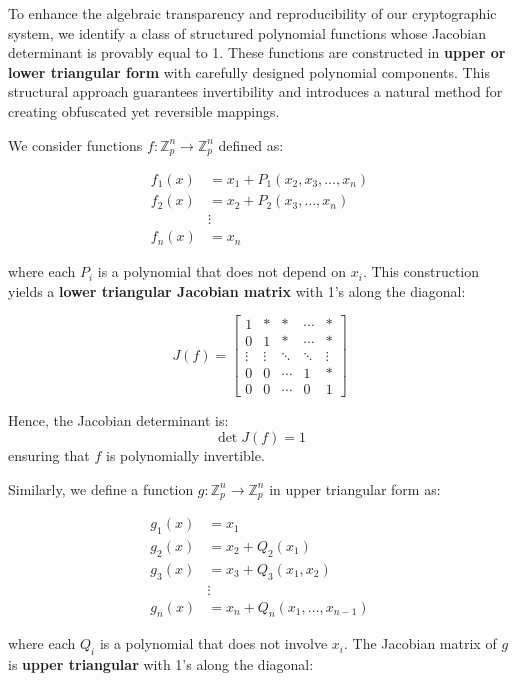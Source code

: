 \documentclass[12pt]{article}
\begin{document}
To enhance the algebraic transparency and reproducibility of our cryptographic system, we identify a class of structured polynomial functions whose Jacobian determinant is provably equal to 1. These functions are constructed in \textbf{upper or lower triangular form} with carefully designed polynomial components. This structural approach guarantees invertibility and introduces a natural method for creating obfuscated yet reversible mappings.

We consider functions \( f: \mathbb{Z}_p^n \rightarrow \mathbb{Z}_p^n \) defined as:

\begin{align*}
f_1(x) &= x_1 + P_1(x_2, x_3, \dots, x_n) \\
f_2(x) &= x_2 + P_2(x_3, \dots, x_n) \\
&\vdots \\
f_n(x) &= x_n
\end{align*}

where each \( P_i \) is a polynomial that does not depend on \( x_i \). This construction yields a \textbf{lower triangular Jacobian matrix} with 1’s along the diagonal:

\[
J(f) =
\begin{bmatrix}
1 & * & * & \cdots & * \\
0 & 1 & * & \cdots & * \\
\vdots & \vdots & \ddots & \ddots & \vdots \\
0 & 0 & \cdots & 1 & * \\
0 & 0 & \cdots & 0 & 1
\end{bmatrix}
\]

Hence, the Jacobian determinant is:
\[
\det J(f) = 1
\]
ensuring that \( f \) is polynomially invertible.

Similarly, we define a function \( g: \mathbb{Z}_p^n \rightarrow \mathbb{Z}_p^n \) in upper triangular form as:

\begin{align*}
g_1(x) &= x_1 \\
g_2(x) &= x_2 + Q_2(x_1) \\
g_3(x) &= x_3 + Q_3(x_1, x_2) \\
&\vdots \\
g_n(x) &= x_n + Q_n(x_1, \dots, x_{n-1})
\end{align*}

where each \( Q_i \) is a polynomial that does not involve \( x_i \). The Jacobian matrix of \( g \) is \textbf{upper triangular} with 1’s along the diagonal:
\end{document}
